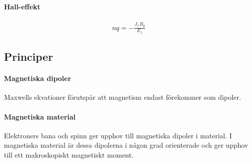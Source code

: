 \paragraph{Hall-effekt}
\begin{align*}
	nq = -\frac{J_xB_y}{E_z}
\end{align*}

\subsection{Principer}

\paragraph{Magnetiska dipoler}
Maxwells ekvationer förutspår att magnetism endast förekommer som dipoler.

\paragraph{Magnetiska material}
Elektroners bana och spinn ger upphov till magnetiska dipoler i material. I magnetiska material är dessa dipolerna i någon grad orienterade och ger upphov till ett makroskopiskt magnetiskt moment.